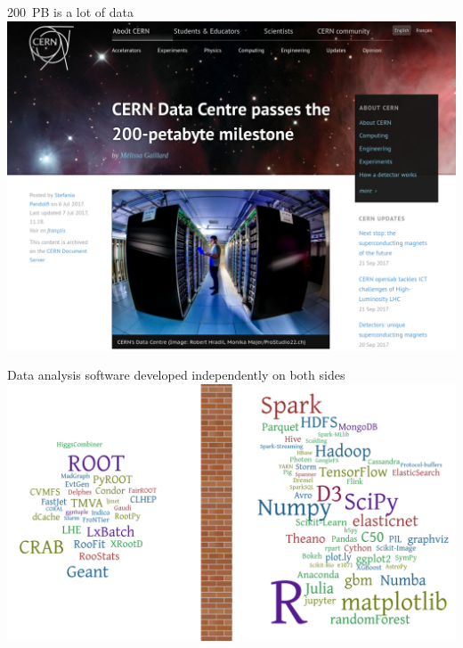 \documentclass[aspectratio=169]{beamer}
\begin{document}
\begin{frame}{{200~PB is a lot of data}}
\vspace{0.35 cm}
\includegraphics[width=0.73\linewidth]{cern-200pb.png}

\vspace{-4.8 cm}
\end{frame}

\begin{frame}{Data analysis software developed independently on both sides}
\vspace{0.17 cm}
\includegraphics[width=\linewidth]{separation-2.png}
\end{frame}
\end{document}
